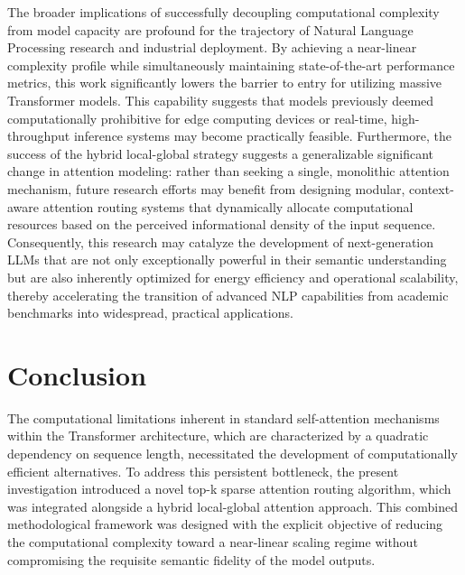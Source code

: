 \documentclass[12pt]{article}
\begin{document}
The broader implications of successfully decoupling computational complexity from model capacity are profound for the trajectory of Natural Language Processing research and industrial deployment. By achieving a near-linear complexity profile while simultaneously maintaining state-of-the-art performance metrics, this work significantly lowers the barrier to entry for utilizing massive Transformer models. This capability suggests that models previously deemed computationally prohibitive for edge computing devices or real-time, high-throughput inference systems may become practically feasible. Furthermore, the success of the hybrid local-global strategy suggests a generalizable significant change in attention modeling: rather than seeking a single, monolithic attention mechanism, future research efforts may benefit from designing modular, context-aware attention routing systems that dynamically allocate computational resources based on the perceived informational density of the input sequence. Consequently, this research may catalyze the development of next-generation LLMs that are not only exceptionally powerful in their semantic understanding but are also inherently optimized for energy efficiency and operational scalability, thereby accelerating the transition of advanced NLP capabilities from academic benchmarks into widespread, practical applications.

\section{Conclusion}
The computational limitations inherent in standard self-attention mechanisms within the Transformer architecture, which are characterized by a quadratic dependency on sequence length, necessitated the development of computationally efficient alternatives. To address this persistent bottleneck, the present investigation introduced a novel top-k sparse attention routing algorithm, which was integrated alongside a hybrid local-global attention approach. This combined methodological framework was designed with the explicit objective of reducing the computational complexity toward a near-linear scaling regime without compromising the requisite semantic fidelity of the model outputs.
\end{document}
